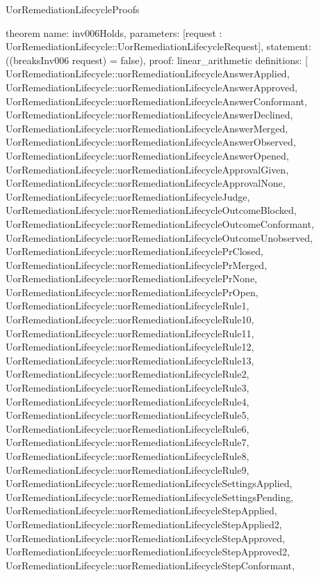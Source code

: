 \begin{lexlean}{UorRemediationLifecycleProofs}
\begin{semanticmodule}
theorem{
  name: inv006Holds,
  parameters: [request : UorRemediationLifecycle::UorRemediationLifecycleRequest],
  statement: ((breaksInv006 request) = false),
  proof: linear_arithmetic{
    definitions: [
      UorRemediationLifecycle::uorRemediationLifecycleAnswerApplied,
      UorRemediationLifecycle::uorRemediationLifecycleAnswerApproved,
      UorRemediationLifecycle::uorRemediationLifecycleAnswerConformant,
      UorRemediationLifecycle::uorRemediationLifecycleAnswerDeclined,
      UorRemediationLifecycle::uorRemediationLifecycleAnswerMerged,
      UorRemediationLifecycle::uorRemediationLifecycleAnswerObserved,
      UorRemediationLifecycle::uorRemediationLifecycleAnswerOpened,
      UorRemediationLifecycle::uorRemediationLifecycleApprovalGiven,
      UorRemediationLifecycle::uorRemediationLifecycleApprovalNone,
      UorRemediationLifecycle::uorRemediationLifecycleJudge,
      UorRemediationLifecycle::uorRemediationLifecycleOutcomeBlocked,
      UorRemediationLifecycle::uorRemediationLifecycleOutcomeConformant,
      UorRemediationLifecycle::uorRemediationLifecycleOutcomeUnobserved,
      UorRemediationLifecycle::uorRemediationLifecyclePrClosed,
      UorRemediationLifecycle::uorRemediationLifecyclePrMerged,
      UorRemediationLifecycle::uorRemediationLifecyclePrNone,
      UorRemediationLifecycle::uorRemediationLifecyclePrOpen,
      UorRemediationLifecycle::uorRemediationLifecycleRule1,
      UorRemediationLifecycle::uorRemediationLifecycleRule10,
      UorRemediationLifecycle::uorRemediationLifecycleRule11,
      UorRemediationLifecycle::uorRemediationLifecycleRule12,
      UorRemediationLifecycle::uorRemediationLifecycleRule13,
      UorRemediationLifecycle::uorRemediationLifecycleRule2,
      UorRemediationLifecycle::uorRemediationLifecycleRule3,
      UorRemediationLifecycle::uorRemediationLifecycleRule4,
      UorRemediationLifecycle::uorRemediationLifecycleRule5,
      UorRemediationLifecycle::uorRemediationLifecycleRule6,
      UorRemediationLifecycle::uorRemediationLifecycleRule7,
      UorRemediationLifecycle::uorRemediationLifecycleRule8,
      UorRemediationLifecycle::uorRemediationLifecycleRule9,
      UorRemediationLifecycle::uorRemediationLifecycleSettingsApplied,
      UorRemediationLifecycle::uorRemediationLifecycleSettingsPending,
      UorRemediationLifecycle::uorRemediationLifecycleStepApplied,
      UorRemediationLifecycle::uorRemediationLifecycleStepApplied2,
      UorRemediationLifecycle::uorRemediationLifecycleStepApproved,
      UorRemediationLifecycle::uorRemediationLifecycleStepApproved2,
      UorRemediationLifecycle::uorRemediationLifecycleStepConformant,
}}
\end{semanticmodule}
\end{lexlean}
